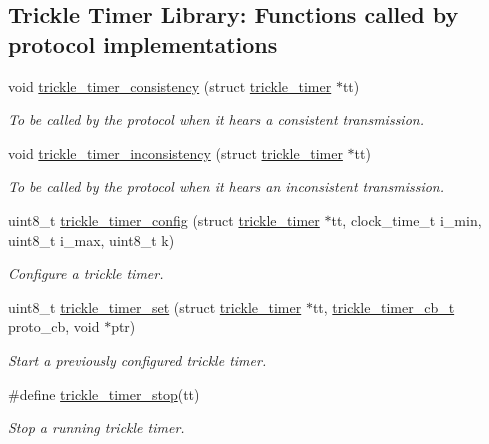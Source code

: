 \subsection*{Trickle Timer Library\+: Functions called by protocol implementations}
\begin{DoxyCompactItemize}
\item 
void \hyperlink{group__trickle-timer_gaf7df1a3da4f9be5e2f17c3b77668eb6e}{trickle\+\_\+timer\+\_\+consistency} (struct \hyperlink{structtrickle__timer}{trickle\+\_\+timer} $\ast$tt)
\begin{DoxyCompactList}\small\item\em To be called by the protocol when it hears a consistent transmission. \end{DoxyCompactList}\item 
void \hyperlink{group__trickle-timer_gae401435f40030c5c4f0f49e813fd9afc}{trickle\+\_\+timer\+\_\+inconsistency} (struct \hyperlink{structtrickle__timer}{trickle\+\_\+timer} $\ast$tt)
\begin{DoxyCompactList}\small\item\em To be called by the protocol when it hears an inconsistent transmission. \end{DoxyCompactList}\item 
uint8\+\_\+t \hyperlink{group__trickle-timer_ga4b21d9fbed3c0c903fa1687b812a7f9c}{trickle\+\_\+timer\+\_\+config} (struct \hyperlink{structtrickle__timer}{trickle\+\_\+timer} $\ast$tt, clock\+\_\+time\+\_\+t i\+\_\+min, uint8\+\_\+t i\+\_\+max, uint8\+\_\+t k)
\begin{DoxyCompactList}\small\item\em Configure a trickle timer. \end{DoxyCompactList}\item 
uint8\+\_\+t \hyperlink{group__trickle-timer_ga57b03043f109c0b2adb1dc92637ee8b4}{trickle\+\_\+timer\+\_\+set} (struct \hyperlink{structtrickle__timer}{trickle\+\_\+timer} $\ast$tt, \hyperlink{group__trickle-timer_ga243193848d28e6373682b8bd2e25850a}{trickle\+\_\+timer\+\_\+cb\+\_\+t} proto\+\_\+cb, void $\ast$ptr)
\begin{DoxyCompactList}\small\item\em Start a previously configured trickle timer. \end{DoxyCompactList}\item 
\#define \hyperlink{group__trickle-timer_gaa475b1b9b3edd81df04d290bd34d7e72}{trickle\+\_\+timer\+\_\+stop}(tt)
\begin{DoxyCompactList}\small\item\em Stop a running trickle timer. \end{DoxyCompactList}\item 

\end{DoxyCompactItemize}
